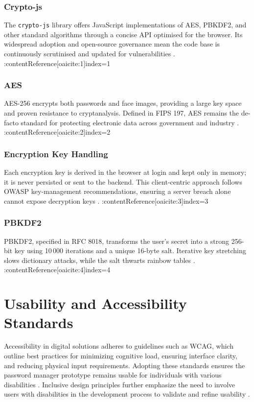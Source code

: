 \subsubsection{Crypto-js}  
The \texttt{crypto-js} library offers JavaScript implementations of AES,
PBKDF2, and other standard algorithms through a concise API optimised for the
browser.  Its widespread adoption and open-source governance mean the code
base is continuously scrutinised and updated for vulnerabilities
\autocite{CryptoJS2024}. :contentReference[oaicite:1]{index=1}

\subsubsection{AES}  
AES-256 encrypts both passwords and face images, providing a large key space
and proven resistance to cryptanalysis.  Defined in FIPS 197, AES remains the
de-facto standard for protecting electronic data across government and
industry \autocite{NISTFIPS197}. :contentReference[oaicite:2]{index=2}

\subsubsection{Encryption Key Handling}  
Each encryption key is derived in the browser at login and kept only in
memory; it is never persisted or sent to the backend.  This client-centric
approach follows OWASP key-management recommendations, ensuring a server
breach alone cannot expose decryption keys
\autocite{OWASPKeyMgmt2025}. :contentReference[oaicite:3]{index=3}

\subsubsection{PBKDF2}  
PBKDF2, specified in RFC 8018, transforms the user’s secret into a strong
256-bit key using 10\,000 iterations and a unique 16-byte salt.  Iterative
key stretching slows dictionary attacks, while the salt thwarts rainbow
tables \autocite{RFC8018}. :contentReference[oaicite:4]{index=4}

\section{Usability and Accessibility Standards}
Accessibility in digital solutions adheres to guidelines such as WCAG, which outline best practices for minimizing cognitive load, ensuring interface clarity, and reducing physical input requirements. Adopting these standards ensures the password manager prototype remains usable for individuals with various disabilities \autocite{Brewer2023}. Inclusive design principles further emphasize the need to involve users with disabilities in the development process to validate and refine usability \autocite{Lazar2015}.


